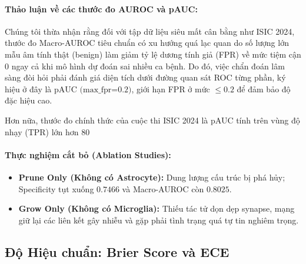 \documentclass[11pt, a4paper]{article}
\begin{document}
\paragraph{Thảo luận về các thước đo AUROC và pAUC:}
Chúng tôi thừa nhận rằng đối với tập dữ liệu siêu mất cân bằng như ISIC 2024, thước đo Macro-AUROC tiêu chuẩn có xu hướng quá lạc quan do số lượng lớn mẫu âm tính thật (benign) làm giảm tỷ lệ dương tính giả (FPR) về mức tiệm cận 0 ngay cả khi mô hình dự đoán sai nhiều ca bệnh. Do đó, việc chẩn đoán lâm sàng đòi hỏi phải đánh giá diện tích dưới đường quan sát ROC từng phần, ký hiệu ở đây là $\text{pAUC (max\_fpr=0.2)}$, giới hạn FPR ở mức $\le 0.2$ để đảm bảo độ đặc hiệu cao.

Hơn nữa, thước đo chính thức của cuộc thi ISIC 2024 là pAUC tính trên vùng độ nhạy (TPR) lớn hơn 80%

\paragraph{Thực nghiệm cắt bỏ (Ablation Studies):}
\begin{itemize}
    \item \textbf{Prune Only (Không có Astrocyte):} Dung lượng cấu trúc bị phá hủy; Specificity tụt xuống $0.7466$ và Macro-AUROC còn $0.8025$.
    \item \textbf{Grow Only (Không có Microglia):} Thiếu tác tử dọn dẹp synapse, mạng giữ lại các liên kết gây nhiễu và gặp phải tình trạng quá tự tin nghiêm trọng.
\end{itemize}

\subsection{Độ Hiệu chuẩn: Brier Score và ECE}\label{subsec:calibration}
\end{document}

